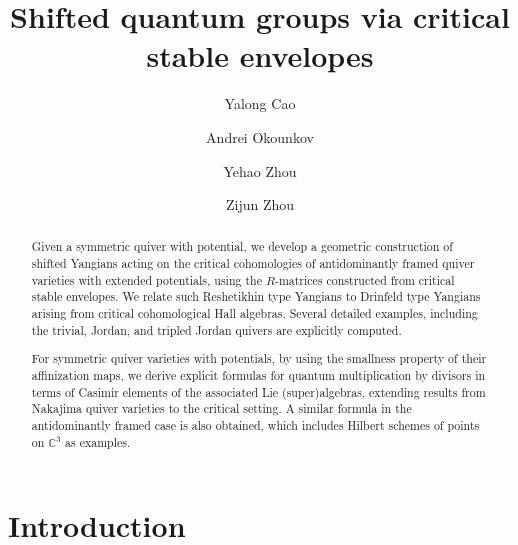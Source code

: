 \documentclass[10pt]{amsart}
\title{Shifted quantum groups via critical stable envelopes}
\author{Yalong Cao}
\author{Andrei Okounkov}
\author{Yehao Zhou}
\author{Zijun Zhou}
\theoremstyle{definition}
\numberwithin{equation}{section}
\begin{document}
\begin{abstract}


Given a symmetric quiver with potential, 
we develop a geometric construction of shifted Yangians acting on the critical cohomologies of antidominantly framed quiver varieties with extended potentials, using the $R$-matrices constructed from critical stable envelopes. 
We relate such Reshetikhin type Yangians to Drinfeld type Yangians arising from critical cohomological Hall algebras.
Several detailed examples, including the trivial, Jordan, and tripled Jordan quivers are explicitly computed. 

For symmetric quiver varieties with potentials, by using the smallness property of their affinization maps, 
we derive explicit formulas for quantum multiplication by divisors in terms of Casimir elements of the associated Lie (super)algebras, extending 
results from Nakajima quiver varieties to the critical setting. A similar formula in the antidominantly framed case is also obtained, which includes Hilbert schemes of points on $\mathbb C^3$ as examples.



\end{abstract}

\maketitle

\setcounter{tocdepth}{1}
\tableofcontents


\setlength{\parskip}{1ex}

\allowdisplaybreaks

\vspace{1cm}

\section{Introduction}
\end{document}
